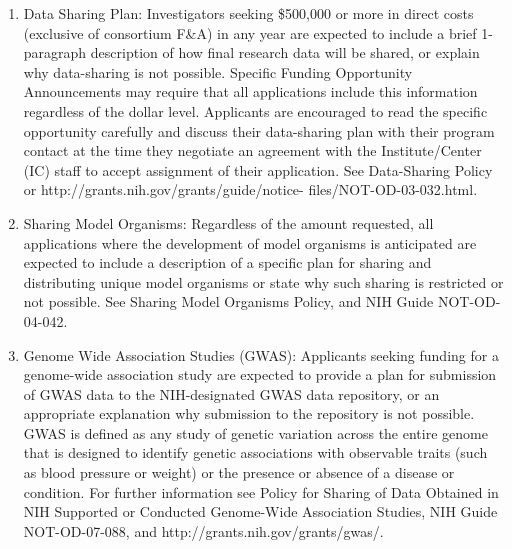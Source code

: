 \documentclass[11pt,notitlepage]{article}
\begin{document}
\begin{enumerate}
\item{Data Sharing Plan:} Investigators seeking \$500,000 or more in direct costs (exclusive of consortium F\&A) in any year are expected to include a brief 1-paragraph description of how final research data will be shared, or explain why data-sharing is not possible. Specific Funding Opportunity Announcements may require that all applications include this information regardless of the dollar level. Applicants are encouraged to read the specific opportunity carefully and discuss their data-sharing plan with their program contact at the time they negotiate an agreement with the Institute/Center (IC) staff to accept assignment of their application. See Data-Sharing Policy or http://grants.nih.gov/grants/guide/notice- files/NOT-OD-03-032.html.
\item{Sharing Model Organisms:} Regardless of the amount requested, all applications where the development of model organisms is anticipated are expected to include a description of a specific plan for sharing and distributing unique model organisms or state why such sharing is restricted or not possible. See Sharing Model Organisms Policy, and NIH Guide NOT-OD-04-042.
\item{Genome Wide Association Studies (GWAS):} Applicants seeking funding for a genome-wide association study are expected to provide a plan for submission of GWAS data to the NIH-designated GWAS data repository, or an appropriate explanation why submission to the repository is not possible. GWAS is defined as any study of genetic variation across the entire genome that is designed to identify genetic associations with observable traits (such as blood pressure or weight) or the presence or absence of a disease or condition. For further information see Policy for Sharing of Data Obtained in NIH Supported or Conducted Genome-Wide Association Studies, NIH Guide NOT-OD-07-088, and http://grants.nih.gov/grants/gwas/.
\end{enumerate}


\newpage


\end{document}
